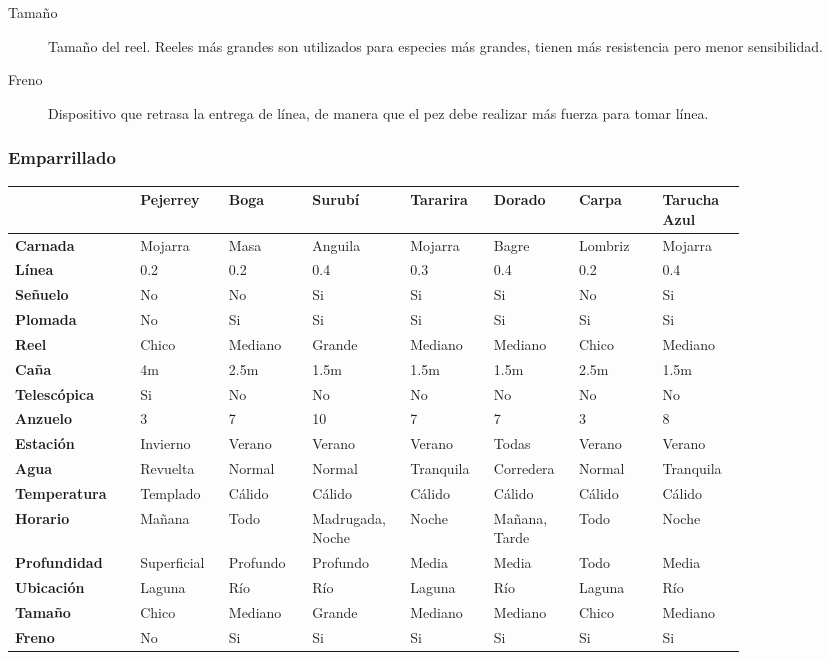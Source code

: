 \documentclass[a4paper,11pt]{article}
\begin{document}
\begin{description}
  \item[Tamaño] Tamaño del reel. Reeles más grandes son utilizados para
    especies más grandes, tienen más resistencia pero menor sensibilidad.

  \item[Freno] Dispositivo que retrasa la entrega de línea, de manera que el
    pez debe realizar más fuerza para tomar línea.

\end{description}

\subsubsection{Emparrillado}\label{sec:emp}

\begin{table}[h!]
\centering
\begin{tabular}{ | p{0.15\linewidth} | p{0.10\linewidth} | p{0.10\linewidth} | p{0.10\linewidth} | p{0.10\linewidth} | p{0.10\linewidth} | p{0.10\linewidth} | p{0.10\linewidth} | }
  \hline
  & \textbf{Pejerrey} & \textbf{Boga} & \textbf{Surubí} & \textbf{Tararira} & \textbf{Dorado} & \textbf{Carpa} & \textbf{Tarucha Azul} \\\hline
  \textbf{Carnada} & Mojarra & Masa & Anguila & Mojarra & Bagre & Lombriz & Mojarra \\\hline
  \textbf{Línea} & 0.2 & 0.2 & 0.4 & 0.3 & 0.4 & 0.2 & 0.4 \\\hline
  \textbf{Señuelo} & No & No & Si & Si & Si & No & Si \\\hline
  \textbf{Plomada} & No & Si & Si & Si & Si & Si & Si \\\hline
  \textbf{Reel} & Chico & Mediano & Grande & Mediano & Mediano & Chico & Mediano \\\hline
  \textbf{Caña} & 4m & 2.5m & 1.5m & 1.5m & 1.5m & 2.5m & 1.5m \\\hline
  \textbf{Telescópica} & Si & No & No & No & No & No & No \\\hline
  \textbf{Anzuelo} & 3 & 7 & 10 & 7 & 7 & 3 & 8 \\\hline
  \textbf{Estación} & Invierno & Verano & Verano & Verano & Todas & Verano & Verano \\\hline
  \textbf{Agua} & Revuelta & Normal & Normal & Tranquila & Corredera & Normal & Tranquila \\\hline
  \textbf{Temperatura} & Templado & Cálido & Cálido & Cálido & Cálido & Cálido & Cálido \\\hline
  \textbf{Horario} & Mañana & Todo & Madrugada, Noche & Noche & Mañana, Tarde & Todo & Noche \\\hline
  \textbf{Profundidad} & Superficial & Profundo & Profundo & Media & Media & Todo & Media \\\hline
  \textbf{Ubicación} & Laguna & Río & Río & Laguna & Río & Laguna & Río \\\hline
  \textbf{Tamaño} & Chico & Mediano & Grande & Mediano & Mediano & Chico & Mediano \\\hline
  \textbf{Freno} & No & Si & Si & Si & Si & Si & Si \\\hline
\end{tabular}
\end{table}
\end{document}
